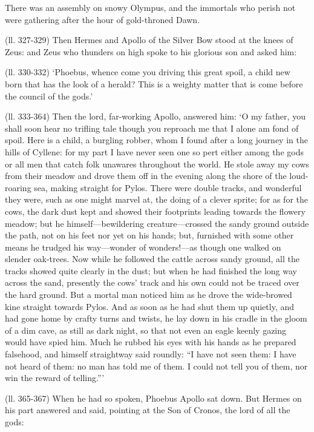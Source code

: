 There was an assembly on snowy Olympus, and the immortals who perish not were
gathering after the hour of gold-throned Dawn.

(ll. 327-329) Then Hermes and Apollo of the Silver Bow stood at the knees of
Zeus: and Zeus who thunders on high spoke to his glorious son and asked him:

(ll. 330-332) ‘Phoebus, whence come you driving this great spoil, a child
new born that has the look of a herald? This is a weighty matter that is come
before the council of the gods.’

(ll. 333-364) Then the lord, far-working Apollo, answered him: ‘O my
father, you shall soon hear no trifling tale though you reproach me that I
alone am fond of spoil. Here is a child, a burgling robber, whom I found after
a long journey in the hills of Cyllene: for my part I have never seen one so
pert either among the gods or all men that catch folk unawares throughout the
world. He stole away my cows from their meadow and drove them off in the
evening along the shore of the loud-roaring sea, making straight for Pylos.
There were double tracks, and wonderful they were, such as one might marvel at,
the doing of a clever sprite; for as for the cows, the dark dust kept and
showed their footprints leading towards the flowery meadow; but he
himself—bewildering creature—crossed the sandy ground outside the
path, not on his feet nor yet on his hands; but, furnished with some other
means he trudged his way—wonder of wonders!—as though one walked on
slender oak-trees. Now while he followed the cattle across sandy ground, all
the tracks showed quite clearly in the dust; but when he had finished the long
way across the sand, presently the cows’ track and his own could not be
traced over the hard ground. But a mortal man noticed him as he drove the
wide-browed kine straight towards Pylos. And as soon as he had shut them up
quietly, and had gone home by crafty turns and twists, he lay down in his
cradle in the gloom of a dim cave, as still as dark night, so that not even an
eagle keenly gazing would have spied him. Much he rubbed his eyes with his
hands as he prepared falsehood, and himself straightway said roundly: “I
have not seen them: I have not heard of them: no man has told me of them. I
could not tell you of them, nor win the reward of telling.”’

(ll. 365-367) When he had so spoken, Phoebus Apollo sat down. But Hermes on his
part answered and said, pointing at the Son of Cronos, the lord of all the
gods:

